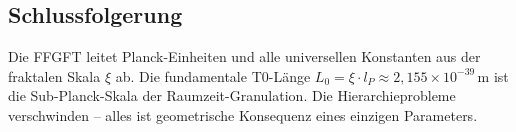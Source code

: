 	\subsection*{Schlussfolgerung}
	
	Die FFGFT leitet Planck-Einheiten und alle universellen Konstanten aus der fraktalen Skala \(\xi\) ab. Die fundamentale T0-Länge \(L_0 = \xi \cdot l_P \approx 2{,}155 \times 10^{-39}\,\)m ist die Sub-Planck-Skala der Raumzeit-Granulation. Die Hierarchieprobleme verschwinden -- alles ist geometrische Konsequenz eines einzigen Parameters.



